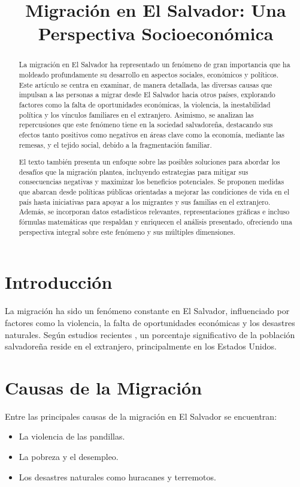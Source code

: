 \documentclass[conference]{IEEEtran}
\title{Migración en El Salvador: Una Perspectiva Socioeconómica}
\author{\IEEEauthorblockN{Natanael de Jesús Rivera Hernández}
\IEEEauthorblockA{Facultad de ingenieria\\
Universidad Francisco  Gavidia\\
Email: natanael.rivera@gmail.com}
\and
\IEEEauthorblockN{Rene Salvador Cardoza Godínez}
\IEEEauthorblockA{Facultad de ingenieria\\
Universidad Francisco Gavidia\\
Email: rene.cardoza@gmail.com}
}
\begin{document}
\maketitle

\begin{abstract}
    La migración en El Salvador ha representado un fenómeno de gran importancia que ha moldeado profundamente su desarrollo en aspectos sociales, económicos y políticos. Este artículo se centra en examinar, de manera detallada, las diversas causas que impulsan a las personas a migrar desde El Salvador hacia otros países, explorando factores como la falta de oportunidades económicas, la violencia, la inestabilidad política y los vínculos familiares en el extranjero. Asimismo, se analizan las repercusiones que este fenómeno tiene en la sociedad salvadoreña, destacando sus efectos tanto positivos como negativos en áreas clave como la economía, mediante las remesas, y el tejido social, debido a la fragmentación familiar.

    El texto también presenta un enfoque sobre las posibles soluciones para abordar los desafíos que la migración plantea, incluyendo estrategias para mitigar sus consecuencias negativas y maximizar los beneficios potenciales. Se proponen medidas que abarcan desde políticas públicas orientadas a mejorar las condiciones de vida en el país hasta iniciativas para apoyar a los migrantes y sus familias en el extranjero. Además, se incorporan datos estadísticos relevantes, representaciones gráficas e incluso fórmulas matemáticas que respaldan y enriquecen el análisis presentado, ofreciendo una perspectiva integral sobre este fenómeno y sus múltiples dimensiones.
\end{abstract}

\section{Introducción}
La migración ha sido un fenómeno constante en El Salvador, influenciado por factores como la violencia, la falta de oportunidades económicas y los desastres naturales. Según estudios recientes \cite{unmigration2021}, un porcentaje significativo de la población salvadoreña reside en el extranjero, principalmente en los Estados Unidos.

\section{Causas de la Migración}
Entre las principales causas de la migración en El Salvador se encuentran:
\begin{itemize}
    \item La violencia de las pandillas.
    \item La pobreza y el desempleo.
    \item Los desastres naturales como huracanes y terremotos.
\end{itemize}
\end{document}
